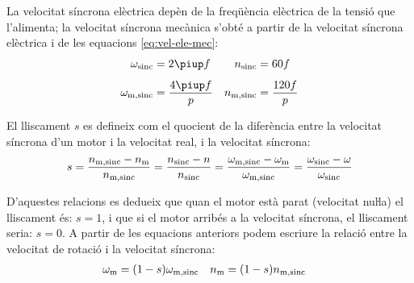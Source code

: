 La velocitat síncrona elèctrica depèn de la freqüència elèctrica de la tensió que l'alimenta; la velocitat síncrona mecànica s'obté a partir de la velocitat síncrona elèctrica i de  les equacions \eqref{eq:vel-ele-mec}:
\begin{subequations}\index{motors d'inducció!velocitat síncrona}
\begin{align}
    \omega\ped{sinc} &= 2 \piup f & n\ped{sinc} &= 60 f \\[1ex]
    \omega\ped{m,sinc} &= \frac{4 \piup f}{p} & n\ped{m,sinc} &= \frac{120 f}{p}\label{eq:vel-mec-sinc}
\end{align}
\end{subequations}

El lliscament $s$ es defineix com el quocient de la diferència entre la velocitat síncrona d'un motor i la velocitat real, i la velocitat síncrona:
\begin{equation}\label{eq:lliscament}\index{lliscament}
    s = \frac{n\ped{m,sinc}-n\ped{m}}{n\ped{m,sinc}} =
    \frac{n\ped{sinc}-n}{n\ped{sinc}} =
    \frac{\omega\ped{m,sinc}-\omega\ped{m}}{\omega\ped{m,sinc}} =
    \frac{\omega\ped{sinc}-\omega}{\omega\ped{sinc}}
\end{equation}

D'aquestes relacions es dedueix que quan el motor està parat (velocitat nuŀla) el lliscament és: $s=1$, i que si el motor arribés a la velocitat síncrona, el lliscament seria: $s=0$. A partir de les equacions anteriors podem escriure la relació entre la velocitat de rotació i la velocitat síncrona:
\begin{align}
    \omega_\mathrm{m} &= (1-s) \omega_\mathrm{m,sinc} & n_\mathrm{m} &= (1-s) n_\mathrm{m,sinc} \label{eq:wm-wsinc}
\end{align}


